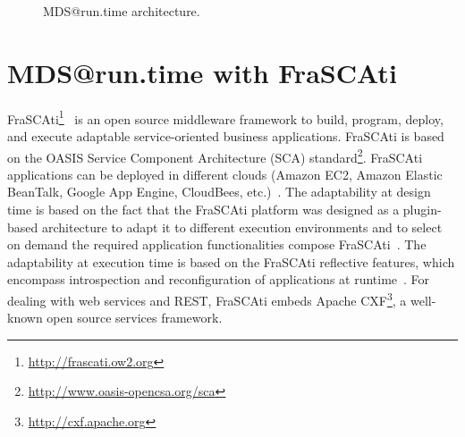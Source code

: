 \documentclass[runningheads,a4paper]{llncs}
\begin{document}
\begin{figure}
    \centering
    \caption{MDS@run.time architecture.}
    \label{fig:archi}
\end{figure}

\section{MDS@run.time with FraSCAti}
\label{mdsAtRuntimeWithFrascati}
FraSCAti\footnote{\url{http://frascati.ow2.org}}~\cite{SMF09} is an open source middleware framework to build, program, deploy, and execute adaptable service-oriented business applications.
FraSCAti is based on the OASIS Service Component Architecture (SCA) standard\footnote{\url{http://www.oasis-opencsa.org/sca}}. FraSCAti applications can be deployed in different clouds (Amazon EC2, Amazon Elastic BeanTalk, Google App Engine, CloudBees, etc.)~\cite{MRS11}\cite{PHM12}\cite{fawaz2013COMPJ}. The adaptability at design time is based on the fact that the FraSCAti platform was designed as a plugin-based architecture to adapt it to different execution environments and to select on demand the required application functionalities compose FraSCAti~\cite{acher:inria-00614984}. The adaptability at execution time is based on the FraSCAti reflective features, which encompass introspection and reconfiguration of applications at runtime~\cite{SMR12}.
For dealing with web services and REST, FraSCAti embeds Apache CXF\footnote{\url{http://cxf.apache.org}}, a well-known open source services framework.
\end{document}
